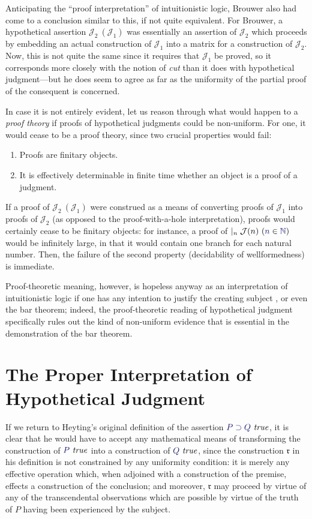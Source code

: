 \documentclass[11pt]{amsart}
\theoremstyle{definition}
\theoremstyle{remark}
\numberwithin{equation}{section}
\def\InputModeColorName{MidnightBlue}
\newcommand\InputMode[1]{{\color{\InputModeColorName}{#1}}}
\newcommand\HypJ[2]{#1\ (#2)}
\newcommand\GenJ[2]{\vert_{#1}\; #2}
\newcommand\JJ{\mathcal{J}}
\newcommand\IsTrue[1]{\InputMode{#1}\ \mathit{true}}
\newcommand\Member[2]{\InputMode{#1}\in \InputMode{#2}}
\newcommand\Nat{\mathbb{N}}
\newcommand\Imp[2]{#1\supset #2}
\begin{document}
Anticipating the ``proof interpretation'' of intuitionistic logic, Brouwer also
had come to a conclusion similar to this, if not quite equivalent. For Brouwer,
a hypothetical assertion $\HypJ{\JJ_2}{\JJ_1}$ was essentially an assertion of
$\JJ_2$ which proceeds by embedding an actual construction of $\JJ_1$ into a
matrix for a construction of $\JJ_2$. Now, this is not quite the same since it
requires that $\JJ_1$ be proved, so it corresponds more closely with the notion
of \emph{cut} than it does with hypothetical judgment---but he does seem to
agree as far as the uniformity of the partial proof of the consequent is
concerned.

In case it is not entirely evident, let us reason through what would happen to a
\emph{proof theory} if proofs of hypothetical judgments could be non-uniform.
For one, it would cease to be a proof theory, since two crucial properties would
fail:

\begin{enumerate}
  \item Proofs are finitary objects.
  \item It is effectively determinable in finite time whether an object is
    a proof of a judgment.
\end{enumerate}

If a proof of $\HypJ{\JJ_2}{\JJ_1}$ were construed as a means of converting
proofs of $\JJ_1$ into proofs of $\JJ_2$ (as opposed to the proof-with-a-hole
interpretation), proofs would certainly cease to be finitary objects: for
instance, a proof of $\GenJ{n}{\HypJ{\JJ(n)}{\Member{n}{\Nat}}}$ would be
infinitely large, in that it would contain one branch for each natural number.
Then, the failure of the second property (decidability of wellformedness) is
immediate.

Proof-theoretic meaning, however, is hopeless anyway as an interpretation of
intuitionistic logic if one has any intention to justify the creating subject
\cite{mva:personal}, or even the bar theorem; indeed, the proof-theoretic
reading of hypothetical judgment specifically rules out the kind of non-uniform
evidence that is essential in the demonstration of the bar theorem.

\section{The Proper Interpretation of Hypothetical Judgment}

If we return to Heyting's original definition of the assertion
$\IsTrue{\Imp{P}{Q}}$, it is clear that he would have to accept any mathematical
means of transforming the construction of $\IsTrue{P}$ into a construction of
$\IsTrue{Q}$, since the construction $\mathfrak{r}$ in his definition is not
constrained by any uniformity condition: it is merely any effective operation
which, when adjoined with a construction of the premise, effects a construction
of the conclusion; and moreover, $\mathfrak{r}$ may proceed by virtue of any of
the transcendental observations which are possible by virtue of the truth of $P$
having been experienced by the subject.
\end{document}
